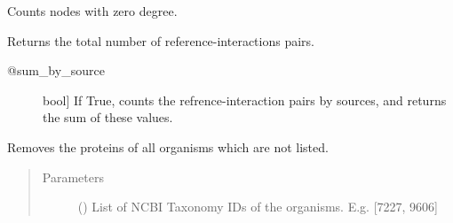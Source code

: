 \documentclass[letterpaper,10pt,english]{sphinxmanual}
\begin{document}
\begin{fulllineitems}

\begin{fulllineitems}
\label{\detokenize{main:pypath.main.PyPath.count_sol}}
Counts nodes with zero degree.

\end{fulllineitems}


\begin{fulllineitems}
\label{\detokenize{main:pypath.main.PyPath.curation_effort}}
Returns the total number of reference-interactions pairs.
\begin{description}
\item[{@sum\_by\_source}] \leavevmode{[}bool{]}
If True, counts the refrence-interaction pairs by
sources, and returns the sum of these values.

\end{description}

\end{fulllineitems}


\begin{fulllineitems}
\label{\detokenize{main:pypath.main.PyPath.curation_stats}}
\end{fulllineitems}


\begin{fulllineitems}
\label{\detokenize{main:pypath.main.PyPath.curation_tab}}
\end{fulllineitems}


\begin{fulllineitems}
\label{\detokenize{main:pypath.main.PyPath.delete_by_taxon}}
Removes the proteins of all organisms which are not listed.
\begin{quote}\begin{description}
\item[{Parameters}] \leavevmode
{} () \textendash{} List of NCBI Taxonomy IDs of the organisms.
E.g. {[}7227, 9606{]}


\end{description}
\end{quote}
\end{fulllineitems}
\end{fulllineitems}
\end{document}
